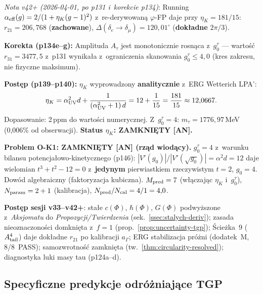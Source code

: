 \begin{remark}
\smallskip\noindent
\emph{Nota v42+ (2026-04-01, po p131 i~korekcie p134)}:
Running $\alpha_{\rm eff}(g) = 2/(1+\eta_K(g-1)^2)$ z~re-derywowan\k{a}
$\varphi$-FP daje przy $\eta_K = 181/15$:
$r_{21} = 206{,}768$ (\textbf{zachowane}),
$\Delta(\delta_e \to \delta_\mu) = 120{,}01^\circ$ (\textbf{dok\l{}adne} $2\pi/3$).

\textbf{Korekta (p134e--g):} Amplituda $A_\tau$ jest monotonicznie
rosn\k{a}ca z~$g_0^\tau$ --- warto\'s\'c $r_{31} = 3477{,}5$ z~p131
wynika\l{}a z~ograniczenia skanowania $g_0^\tau \le 4{,}0$
(kres zakresu, nie fizyczne maksimum).

\textbf{Post\k{e}p (p139--p140):} $\eta_K$ wyprowadzony \textbf{analitycznie}
z~ERG Wetterich LPA':
\begin{equation}
  \eta_K = \alpha_{\rm UV}^2 d + \frac{1}{(\alpha_{\rm UV}^2+1)\,d}
  = 12 + \frac{1}{15} = \frac{181}{15} \approx 12{,}0667.
\end{equation}
Dopasowanie: 2\,ppm do warto\'sci numerycznej. Z~$g_0^\tau=4$:
$m_\tau = 1776{,}97$\,MeV (0{,}006\% od obserwacji).
\textbf{Status $\eta_K$: ZAMKNI\k{E}TY [AN].}

\textbf{Problem O-K1: ZAMKNI\k{E}TY [AN] (rz\k{a}d wiod\k{a}cy).}
$g_0^\tau = 4$ z~warunku bilansu potencja\l{}owo-kinetycznego (p146):
$|V'(g_0)|/|V'(\sqrt{g_0})| = \alpha^2 d = 12$ daje wielomian
$t^3+t^2-12=0$ z~\textbf{jedynym} pierwiastkiem rzeczywistym $t=2$,
$g_0=4$. Dow\'od algebraiczny (faktoryzacja kubiczna).
$M_{\rm pred} = 7$ (w\l{}\k{a}czaj\k{a}c $\eta_K$ i~$g_0^\tau$),
$N_{\rm param} = 2 + 1$ (kalibracja),
$N_{\rm pred}/N_{\rm cal} = 4/1 = 4{,}0$.

\medskip\noindent
\textbf{Post\k{e}p sesji v33--v42+}:
sta\l{}e $c(\Phi)$, $\hbar(\Phi)$, $G(\Phi)$ podwy\.zszone
z~\textit{Aksjomatu} do \textit{Propozycji/Twierdzenia}
(sek.~\ref{ssec:stalych-deriv}); zasada nieoznaczono\'sci
domkni\k{e}ta z~$f = 1$ (prop.~\ref{prop:uncertainty-tgp});
\'Scie\.zka~9 ($A_{\rm tail}^4$) daje dok\l{}adne
$r_{21}$ po kalibracji $a_\Gamma$;
ERG stabilizacja pr\'o\.zni (dodatek~M, 8/8~PASS);
samozwrotno\'s\'c zamkni\k{e}ta (tw.~\ref{thm:circularity-resolved});
diagnostyka luki masy tau (p124a--d).
\end{remark}

\subsection{Specyficzne predykcje odr\'o\.zniaj\k{a}ce TGP}\label{ssec:specyficzne}

